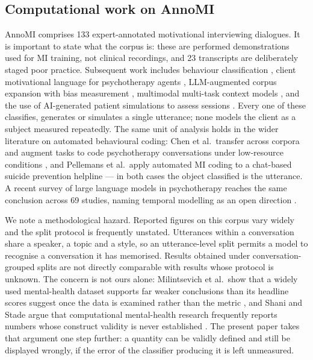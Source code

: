\documentclass[conference]{IEEEtran}
\begin{document}
\subsection{Computational work on AnnoMI}
AnnoMI \cite{wu2022,wu2023} comprises 133 expert-annotated motivational
interviewing dialogues. It is important to state what the corpus is: these are
performed demonstrations used for MI training, not clinical recordings, and
23 transcripts are deliberately staged poor practice. Subsequent work includes
behaviour classification \cite{tavabi2021}, client motivational language for
psychotherapy agents \cite{hoang2024}, LLM-augmented corpus expansion with
bias measurement \cite{kumar2024}, multimodal multi-task context models
\cite{m3tcm2024}, and the use of AI-generated patient simulations to assess
sessions \cite{yosef2024}. Every one of these classifies,
generates or simulates a single utterance; none models the client as a subject
measured repeatedly. The same unit of analysis holds in the wider literature
on automated behavioural coding: Chen et al.\ transfer across corpora and
augment tasks to code psychotherapy conversations under low-resource
conditions \cite{chen2022lowresource}, and Pellemans et al.\ apply automated
MI coding to a chat-based suicide prevention helpline
\cite{pellemans2024} --- in both cases the object classified is the utterance.
A recent survey of large language models in psychotherapy reaches the same
conclusion across 69 studies, naming temporal modelling as an open direction
\cite{na2025survey}.

We note a methodological hazard. Reported figures on this corpus vary widely
and the split protocol is frequently unstated. Utterances within a
conversation share a speaker, a topic and a style, so an utterance-level split
permits a model to recognise a conversation it has memorised. Results obtained
under conversation-grouped splits are not directly comparable with results
whose protocol is unknown. The concern is not ours alone: Milintsevich et al.\
show that a widely used mental-health dataset supports far weaker conclusions
than its headline scores suggest once the data is examined rather than the
metric \cite{milintsevich2024}, and Shani and Stade argue that computational
mental-health research frequently reports numbers whose construct validity is
never established \cite{shani2025}. The present paper takes that argument one
step further: a quantity can be validly defined and still be displayed
wrongly, if the error of the classifier producing it is left unmeasured.
\end{document}

